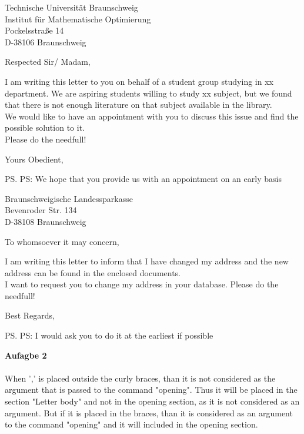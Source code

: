 \documentclass[foldmarks=true, foldmarks=BHLVmtP,subject=titled,version=last]{scrlttr2} %
\begin{document}
\begin{letter}{Technische Universität Braunschweig\\
Institut für Mathematische Optimierung\\
Pockelsstraße 14\\
D-38106 Braunschweig}
\opening{Respected Sir/ Madam,}
I am writing this letter to you on behalf of a student group studying in xx department. We are aspiring students willing to study xx subject, but we found that there is not enough literature on that subject available in the library.\\
We would like to have an appointment with you to discuss this issue and find the possible solution to it.\\
Please do the needfull!

\closing{Yours Obedient,}
\ps PS: We hope that you provide us with an appointment on an early basis
\end{letter}


\begin{letter}{Braunschweigische Landessparkasse\\
Bevenroder Str. 134\\
D-38108 Braunschweig}
\opening{To whomsoever it may concern,}			
I am writing this letter to inform that I have changed my address and the new address can be found in the enclosed documents.\\
I want to request you to change my address in your database.
Please do the needfull!
\closing{Best Regards,}				
\ps PS: I would ask you to do it at the earliest if possible	
\end{letter}


\textbf{Aufagbe 2}\\
\\
When ',' is placed outside the curly braces, than it is not considered as the argument that is passed to the command "opening". Thus it will be placed in the section "Letter body" and not in the opening section, as it is not considered as an argument.
But if it is placed in the braces, than it is considered as an argument to the command "opening" and it will included in the opening section.\\
\end{document}

